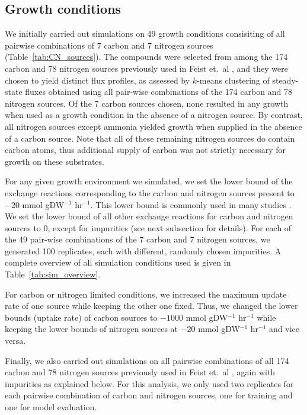 \documentclass[12pt]{article}
\begin{document}
\subsection{Growth conditions} 
We initially carried out simulations on 49 growth conditions consisiting of all pairwise combinations of 7 carbon and 7 nitrogen sources (Table~\ref{tab:CN_sources}). The compounds were selected from among the 174 carbon and 78 nitrogen sources previously used in Feist et.\ al \cite{Feistetal2007}, and they were chosen to yield distinct flux profiles, as assessed by $k$-means clustering of steady-state fluxes obtained using all pair-wise combinations of the 174 carbon and 78 nitrogen sources. Of the 7 carbon sources chosen, none resulted in any growth when used as a growth condition in the absence of a nitrogen source. By contrast, all nitrogen sources except ammonia yielded growth when supplied in the absence of a carbon source. Note that all of these remaining nitrogen sources do contain carbon atoms, thus additional supply of carbon was not strictly necessary for growth on these substrates.

For any given growth environment we simulated, we set the lower bound of the exchange reactions corresponding to the carbon and nitrogen sources present to $-20$ mmol gDW$^{-1}$ hr$^{-1}$. This lower bound is commonly used in many studies \cite{Feistetal2007}. We set the lower bound of all other exchange reactions for carbon and nitrogen sources to 0, except for impurities (see next subsection for details). For each of the 49 pair-wise combinations of the 7 carbon and 7 nitrogen sources, we generated 100 replicates, each with different, randomly chosen impurities. A complete overview of all simulation conditions used is given in Table~\ref{tab:sim_overview}.

For carbon or nitrogen limited conditions, we increased the maximum update rate of one source while keeping the other one fixed. Thus, we changed the lower bounds (uptake rate) of carbon sources to $-1000$ mmol gDW$^{-1}$ hr$^{-1}$ while keeping the lower bounds of nitrogen sources at $-20$ mmol gDW$^{-1}$ hr$^{-1}$ and vice versa. 

Finally, we also carried out simulations on all pairwise combinations of all 174 carbon and 78 nitrogen sources previously used in Feist et.\ al \cite{Feistetal2007}, again with impurities as explained below. For this analysis, we only used two replicates for each pairwise combination of carbon and nitrogen sources, one for training and one for model evaluation.
\end{document}
